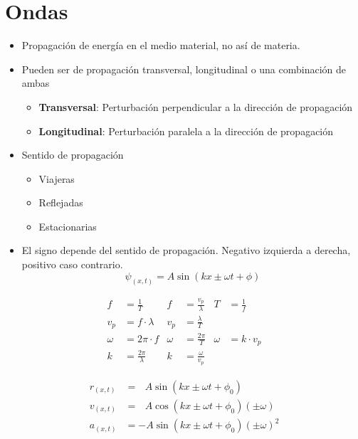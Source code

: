 \section{Ondas}
\begin{itemize}
    \item Propagación de energía en el medio material, no así de materia.
    \item Pueden ser de propagación transversal, longitudinal o una combinación de ambas
    \begin{itemize}
        \item \textbf{Transversal}: Perturbación perpendicular a la dirección de propagación
        \item \textbf{Longitudinal}: Perturbación paralela a la dirección de propagación
    \end{itemize}
    \item Sentido de propagación
    \begin{itemize}
        \item Viajeras
        \item Reflejadas
        \item Estacionarias
    \end{itemize}
\end{itemize}

\begin{itemize}
    \item El signo depende del sentido de propagación. Negativo izquierda a derecha, positivo caso contrario.
    \begin{equation}
        \psi_{(x,t)} = A \sin(kx \pm \omega t + \phi)
    \end{equation}
\end{itemize}

\begin{align}
    f &= \frac{1}{T}            & f&=\frac{v_p}{\lambda} & T &=\frac{1}{f}\\
    v_p &= f \cdot \lambda & v_p &= \frac{\lambda}{T} &\\
    \omega &=2\pi \cdot f & \omega &= \frac{2\pi}{T}   & \omega&= k \cdot v_p \\
    k &= \frac{2\pi}{\lambda}   & k&= \frac{\omega}{v_p} & 
\end{align}

\begin{equation}
\begin{split}
    r_{(x,t)} &= \ \ \ A \sin(kx \pm \omega t + \phi_0)\\
    v_{(x,t)} &= \ \ \ A \cos(kx \pm \omega t + \phi_0)(\pm\omega)\\
    a_{(x,t)} &= -A \sin(kx \pm \omega t + \phi_0)(\pm\omega)^2\\
\end{split}
\end{equation}

